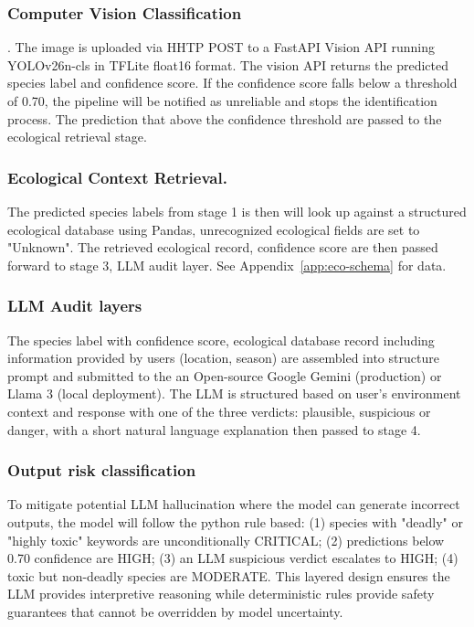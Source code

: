 \documentclass[journal,transmag]{IEEEtran}
\begin{document}
\subsubsection{Computer Vision Classification}.
The image is uploaded via HHTP POST to a FastAPI Vision API running YOLOv26n-cls in TFLite float16 format. The vision API returns the predicted species label and confidence score. If the confidence score falls below a threshold of 0.70, the pipeline will be notified as unreliable and stops the identification process. The prediction that above the confidence threshold are passed to the ecological retrieval stage.

\subsubsection{Ecological Context Retrieval.}
The predicted species labels from stage 1 is then will look up against a structured ecological database using Pandas, unrecognized ecological fields are set to "Unknown". The retrieved ecological record, confidence score are then passed forward to stage 3, LLM audit layer. See Appendix~\ref{app:eco-schema} for data.


\subsubsection{LLM Audit layers}
The species label with confidence score, ecological database record including information provided by users (location, season) are assembled into structure prompt and submitted to the an  Open-source Google Gemini (production) or Llama 3 (local deployment).  The LLM is structured based on user's environment context and response with one of the three verdicts: plausible, suspicious or danger, with a short natural language explanation then passed to stage 4.

\subsubsection{Output risk classification}
To mitigate potential LLM hallucination where the model can generate incorrect outputs\cite{ji2023hallucination}\cite{huang2023llmhallucination}, the model will follow the python rule based: (1) species with "deadly" or "highly toxic" keywords are unconditionally CRITICAL; (2) predictions below 0.70 confidence are HIGH; (3) an LLM suspicious verdict escalates to HIGH; (4) toxic but non-deadly species are MODERATE. This layered design ensures the LLM provides interpretive reasoning while deterministic rules provide safety guarantees that cannot be overridden by model uncertainty.
\end{document}
